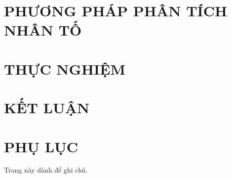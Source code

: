 \documentclass[a4paper, oneside]{report}			%
\theoremstyle{plain} %
\theoremstyle{plain} %
\theoremstyle{nonumberplain} %
\begin{document}
\chapter[PHƯƠNG PHÁP PHÂN TÍCH NHÂN TỐ]{PHƯƠNG PHÁP PHÂN TÍCH NHÂN TỐ}\label{chap.3}

\chapter{THỰC NGHIỆM}\label{chap.4}

\chapter{KẾT LUẬN}\label{chap.5}


\chapter{PHỤ LỤC}\label{phuluc}


\clearpage


\clearpage
\printindex

\begin{titlepage}
\begin{center}
	Trang này dành để ghi chú.
\end{center}
\end{titlepage}
\end{document}
